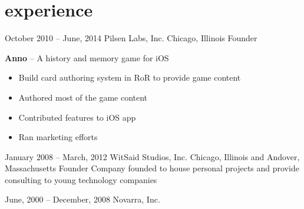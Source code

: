 \documentclass[]{friggeri-cv}
\begin{document}
\pagebreak

\section{experience}
\begin{entrylist}

    \entryalt
    {October 2010 -- June, 2014}
    {Pilsen Labs, Inc.}
    {Chicago, Illinois}
    {Founder}
    {\textbf{Anno} -- A history and memory game for iOS
    \begin{itemize}
      \item Build card authoring system in RoR to provide game content
      \item Authored most of the game content
      \item Contributed features to iOS app
      \item Ran marketing efforts
    \end{itemize}}

    \entryalt
    {January 2008 -- March, 2012}
    {WitSaid Studios, Inc.}
    {Chicago, Illinois and Andover, Massachusetts}
    {Founder}
    {Company founded to house personal projects and provide consulting to young technology companies}

    \entryalt
    {June, 2000 -- December, 2008}
    {Novarra, Inc.}
    
\end{entrylist} 
    
\end{document}
